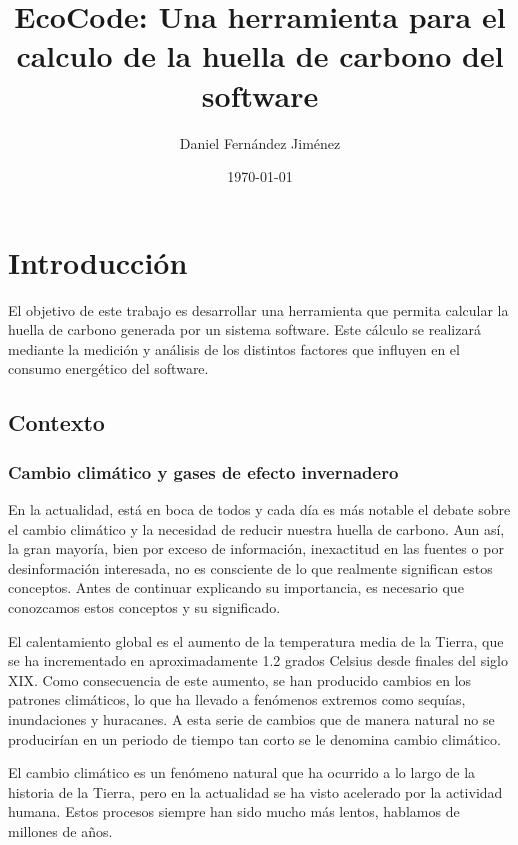 \documentclass[12pt,a4paper]{report}
\title{EcoCode: Una herramienta para el calculo de la huella de carbono del software}
\author{Daniel Fernández Jiménez}
\date{\today}
\begin{document}
\maketitle

\tableofcontents
\newpage

\chapter{Introducción}

El objetivo de este trabajo es desarrollar una herramienta que permita calcular la huella de carbono generada por un sistema software. Este cálculo se realizará mediante la medición y análisis de los distintos 
factores que influyen en el consumo energético del software.

\section{Contexto}

\subsection{Cambio climático y gases de efecto invernadero}

En la actualidad, está en boca de todos y cada día es más notable el debate sobre el cambio climático y la necesidad de reducir nuestra huella de carbono. Aun así, la gran mayoría, bien por exceso de información, 
inexactitud en las fuentes o por desinformación interesada, no es consciente de lo que realmente significan estos conceptos. Antes de continuar explicando su importancia, es necesario que conozcamos estos 
conceptos y su significado.

El calentamiento global es el aumento de la temperatura media de la Tierra, que se ha incrementado en aproximadamente 1.2 grados Celsius desde finales del siglo XIX. Como consecuencia de este aumento, se han 
producido cambios en los patrones climáticos, lo que ha llevado a fenómenos extremos como sequías, inundaciones y huracanes. A esta serie de cambios que de manera natural no se producirían en un periodo de 
tiempo tan corto se le denomina cambio climático.

El cambio climático es un fenómeno natural que ha ocurrido a lo largo de la historia de la Tierra, pero en la actualidad se ha visto acelerado por la actividad humana. Estos procesos siempre han sido mucho más 
lentos, hablamos de millones de años.
\end{document}
